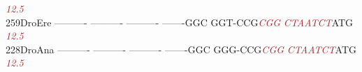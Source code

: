 \documentclass[11pt,twoside,reqno,a4paper]{article}
\begin{document}
{\hspace*{4\charwidth}\hspace*{7\charwidth}\hspace*{1\charwidth}\hspace*{1\charwidth}\hspace*{1\charwidth}\hspace*{1\charwidth}\hspace*{47\charwidth}\textit{\textcolor{brown}{12.5}}\hspace*{1\charwidth}\hspace*{1\charwidth}\\
259\hspace*{1\charwidth}DroEre	----------	----------	----------	-------GGC	GGT-CCG\textit{\textcolor{brown}{C}}\textit{\textcolor{brown}{G}}\textit{\textcolor{brown}{G}}	\textit{\textcolor{brown}{C}}\textit{\textcolor{brown}{T}}\textit{\textcolor{brown}{A}}\textit{\textcolor{brown}{A}}\textit{\textcolor{brown}{T}}\textit{\textcolor{brown}{C}}\textit{\textcolor{brown}{T}}ATG	\\
\hspace*{4\charwidth}\hspace*{7\charwidth}\hspace*{1\charwidth}\hspace*{1\charwidth}\hspace*{1\charwidth}\hspace*{1\charwidth}\hspace*{47\charwidth}\textit{\textcolor{brown}{12.5}}\hspace*{1\charwidth}\hspace*{1\charwidth}\\
228\hspace*{1\charwidth}DroAna	----------	----------	----------	-------GGC	GGG-CCG\textit{\textcolor{brown}{C}}\textit{\textcolor{brown}{G}}\textit{\textcolor{brown}{G}}	\textit{\textcolor{brown}{C}}\textit{\textcolor{brown}{T}}\textit{\textcolor{brown}{A}}\textit{\textcolor{brown}{A}}\textit{\textcolor{brown}{T}}\textit{\textcolor{brown}{C}}\textit{\textcolor{brown}{T}}ATG	\\
\hspace*{4\charwidth}\hspace*{7\charwidth}\hspace*{1\charwidth}\hspace*{1\charwidth}\hspace*{1\charwidth}\hspace*{1\charwidth}\hspace*{47\charwidth}\textit{\textcolor{brown}{12.5}}\hspace*{1\charwidth}\hspace*{1\charwidth}\\
}
\end{document}
